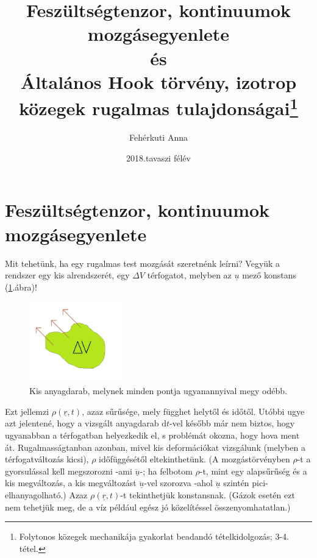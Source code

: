 \documentclass[a4paper, 12pt, titlepage]{article}
\begin{document}
\begin{titlepage} %
\thispagestyle{empty}
\title{Feszültségtenzor, kontinuumok mozgásegyenlete \\és\\Általános Hook törvény, izotrop közegek rugalmas tulajdonságai\thanks{Folytonos közegek mechanikája gyakorlat beadandó tételkidolgozás; 3-4. tétel.}}
\author{Fehérkuti Anna}
\date{2018.tavaszi félév}
\maketitle
\end{titlepage}
\newpage

\pagestyle{plain}
\part*{Feszültségtenzor, kontinuumok mozgásegyenlete} %
Mit tehetünk, ha egy rugalmas test mozgását szeretnénk leírni?
\newline
Vegyük a rendszer egy kis alrendszerét, egy $\Delta V$ térfogatot, melyben az $\underline{u}$ mező konstans (\ref{fig:deltaV}.\hspace{1mm}ábra)!
	\begin{figure}[!h]
	\includegraphics[height=3.5cm]{./deltaV.png} %
	\centering
	\caption{Kis anyagdarab, melynek minden pontja ugyanannyival megy odébb.}
	\label{fig:deltaV}
	\end{figure}
Ezt jellemzi $\rho(\underline{r},t)$, azaz sűrűsége, mely függhet helytől és időtől. Utóbbi ugye azt jelentené, hogy a vizsgált anyagdarab $\mathrm{d}t$-vel később már nem biztos, hogy ugyanabban a térfogatban helyezkedik el, s problémát okozna, hogy hova ment át. Rugalmasságtanban azonban, mivel kis deformációkat vizsgálunk (melyben a térfogatváltozás kicsi), $\rho$ időfüggésétől eltekinthetünk. (A mozgástörvényben $\rho$-t a gyorsulással kell megszorozni -ami $\underline{\ddot{u}}$-; ha felbotom $\rho$-t, mint egy alapsűrűség és a kis megváltozás, a kis megváltozást $\underline{\ddot{u}}$-vel szorozva -ahol $\underline{\ddot{u}}$ szintén pici- elhanyagolható.) Azaz $\rho(\underline{r},t)$-t tekinthetjük konstansnak. (Gázok esetén ezt nem tehetjük meg, de a víz például egész jó közelítéssel összenyomhatatlan.)
\end{document}
